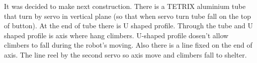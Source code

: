 \begin{enumerate*}
    \item It was decided to make next construction. There is a TETRIX aluminium tube that turn by servo in vertical plane (so that when servo turn tube fall on the top of button). At the end of tube there is U shaped profile. Through the tube and U shaped profile is axis where hang climbers. U-shaped profile dosen't allow climbers to fall during the robot's moving. Also there is a line fixed on the end of axis. The line reel by the second servo so axis move and climbers fall to shelter.
    \begin{figure}[H]
    	\begin{minipage}[h]{0.47\linewidth}
    		\\
    	\end{minipage}
    \end{figure}
  
  \end{enumerate*}	
  
  
  